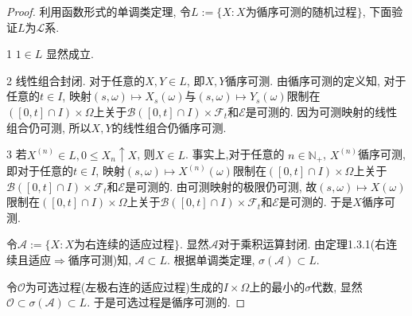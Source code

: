 \documentclass[UTF8,ondside]{ctexart}
\newcommand{\h}{\mathscr}
\newcommand{\kx}{\mathbb}
\newcommand{\circlenumber}[1]{{\small\textcircled{\tiny{#1}}}}
\numberwithin{equation}{section}
\begin{document}
	\begin{proof}
		利用函数形式的单调类定理, 令$L:=\{X:X\text{为循序可测的随机过程}\}$, 下面验证$L$为$\h L$系.

		\circlenumber{1} $1\in L$ 显然成立.

		\circlenumber{2} 线性组合封闭. 对于任意的$X,Y\in L$, 即$X,Y$循序可测. 由循序可测的定义知, 对于任意的$t\in I$, 映射$(s,\omega)\mapsto X_s(\omega)$与$(s,\omega)\mapsto Y_s(\omega)$限制在$([0,t]\cap I)\times\Omega$上关于$\h B([0,t]\cap I)\times\h F_t$和$\h E$是可测的. 因为可测映射的线性组合仍可测, 所以$X,Y$的线性组合仍循序可测. 

		\circlenumber{3} 若$X^{(n)}\in L,0\leq X_n\uparrow X$, 则$X\in L$. 事实上,对于任意的 $n\in\kx N_+$, $X^{(n)}$循序可测, 即对于任意的$t\in I$, 映射$(s,\omega)\mapsto X^{(n)}(\omega)$限制在$([0,t]\cap I)\times\Omega$上关于$\h B([0,t]\cap I)\times\h F_t$和$\h E$是可测的. 由可测映射的极限仍可测, 故$(s,\omega)\mapsto X(\omega)$限制在$([0,t]\cap I)\times\Omega$上关于$\h B([0,t]\cap I)\times\h F_t$和$\h E$是可测的. 于是$X$循序可测.

		令$\h A:=\{X:X\text{为右连续的适应过程}\}$. 显然$\h A$对于乘积运算封闭. 由定理1.3.1(右连续且适应$\Rightarrow$循序可测)知, $\h A\subset L$. 根据单调类定理, $\sigma(\h A)\subset L$.

		令$\h O$为可选过程(左极右连的适应过程)生成的$I\times\Omega$上的最小的$\sigma$代数, 显然$\h O\subset\sigma(\h A)\subset L$. 于是可选过程是循序可测的.
	\end{proof}
	\newpage
\end{document}
